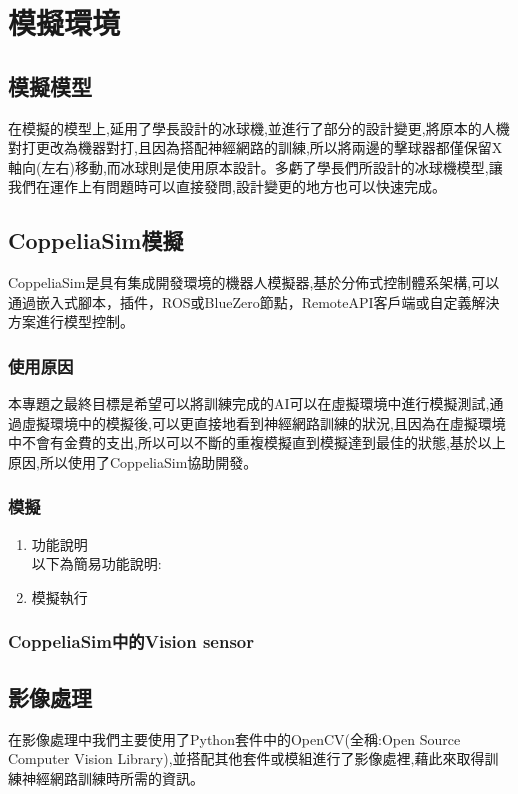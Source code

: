 \documentclass[14pt,a4paper]{report}  %
\begin{document}
\newpage
\chapter{模擬環境}
\section{模擬模型}
\qquad 在模擬的模型上,延用了學長設計的冰球機,並進行了部分的設計變更,將原本的人機對打更改為機器對打,且因為搭配神經網路的訓練,所以將兩邊的擊球器都僅保留X軸向(左右)移動,而冰球則是使用原本設計。多虧了學長們所設計的冰球機模型,讓我們在運作上有問題時可以直接發問,設計變更的地方也可以快速完成。\\
\section{CoppeliaSim模擬}
\qquad CoppeliaSim是具有集成開發環境的機器人模擬器,基於分佈式控制體系架構,可以通過嵌入式腳本，插件，ROS或BlueZero節點，RemoteAPI客戶端或自定義解決方案進行模型控制。\\
\subsection{使用原因}
\qquad 本專題之最終目標是希望可以將訓練完成的AI可以在虛擬環境中進行模擬測試,通過虛擬環境中的模擬後,可以更直接地看到神經網路訓練的狀況,且因為在虛擬環境中不會有金費的支出,所以可以不斷的重複模擬直到模擬達到最佳的狀態,基於以上原因,所以使用了CoppeliaSim協助開發。\\
\subsection{模擬}
\begin{enumerate}

\item 功能說明\\

 以下為簡易功能說明:\\
 
\item 模擬執行\\

\end{enumerate}
\subsection{CoppeliaSim中的Vision sensor}

\section{影像處理}
\qquad 在影像處理中我們主要使用了Python套件中的OpenCV(全稱:Open Source Computer Vision Library),並搭配其他套件或模組進行了影像處裡,藉此來取得訓練神經網路訓練時所需的資訊。\\
\end{document}
